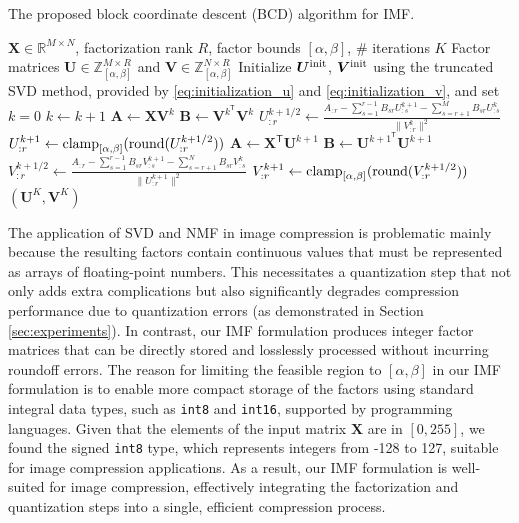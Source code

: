 \begin{algorithm}[!t]
    \caption{The proposed block coordinate descent (BCD) algorithm for IMF. \label{alg:bcd_for_imf}}
    \begin{algorithmic}[1]
        \REQUIRE $\bm{X} \in \mathbb{R}^{M \times N}$, factorization rank $R$, factor bounds $[\alpha,\beta]$, \# iterations $K$
        \ENSURE Factor matrices $\bm{U} \in \mathbb{Z}_{[\alpha,\beta]}^{M \times R}$ and $\bm{V} \in \mathbb{Z}_{[\alpha,\beta]}^{N \times R}$
        \STATE Initialize $\bm{U}^{\rm init}$, $\bm{V}^{\rm init}$ using the truncated SVD method, provided by \eqref{eq:initialization_u} and \eqref{eq:initialization_v}, and set $k=0$
        \STATE $k \gets k+1$
        \STATE $\bm{A} \gets \bm{X} \bm{V}^k$
        \STATE $\bm{B} \gets \bm{V}^{k^{\mathsf{T}}} \bm{V}^k$
        \STATE \label{alg:step:u_update:1} $\displaystyle U_{:r}^{k+1/2} \gets \frac{A_{:r} - \sum_{s = 1}^{r-1} B_{sr} U_{:s}^{k+1} - \sum_{s=r+1}^M B_{sr} U_{:s}^k}{\| V_{:r}^k \|^2}$
        \vspace{2pt}
        \STATE \label{alg:step:u_update:2} $\displaystyle U_{:r}^{k+1} \gets \operatorname{clamp}_{[\alpha,\beta]}(\operatorname{round}( U_{:r}^{k+1/2}))$
        \ENDFOR
        \STATE $\bm{A} \gets \bm{X}^\mathsf{T} \bm{U}^{k+1}$
        \STATE $\bm{B} \gets \bm{U}^{{k+1}^\mathsf{T}} \bm{U}^{k+1}$
        \STATE \label{alg:step:v_update:1} $\displaystyle V_{:r}^{k+1/2} \gets \frac{A_{:r} - \sum_{s = 1}^{r-1} B_{sr} V_{:s}^{k+1} - \sum_{s = r+1}^N B_{sr} V_{:s}^k}{\| U_{:r}^{k+1} \|^2}$
        \vspace{2pt}
        \STATE \label{alg:step:v_update:2} $\displaystyle V_{:r}^{k+1} \gets \operatorname{clamp}_{[\alpha,\beta]}(\operatorname{round}(V_{:r}^{k+1/2}))$
        \ENDFOR
        \ENDWHILE
        \RETURN $(\bm{U}^K, \bm{V}^K)$
    \end{algorithmic}
\end{algorithm}

The application of SVD and NMF in image compression is problematic mainly because the resulting factors contain continuous values that must be represented as arrays of floating-point numbers. This necessitates a quantization step that not only adds extra complications but also significantly degrades compression performance due to quantization errors (as demonstrated in Section \ref{sec:experiments}). In contrast, our IMF formulation produces integer factor matrices that can be directly stored and losslessly processed without incurring roundoff errors. The reason for limiting the feasible region to $[\alpha,\beta]$ in our IMF formulation is to enable more compact storage of the factors using standard integral data types, such as \texttt{int8} and \texttt{int16}, supported by programming languages. Given that the elements of the input matrix $\bm{X}$ are in $[0, 255]$, we found the signed \texttt{int8} type, which represents integers from -128 to 127, suitable for image compression applications. As a result, our IMF formulation is well-suited for image compression, effectively integrating the factorization and quantization steps into a single, efficient compression process.


